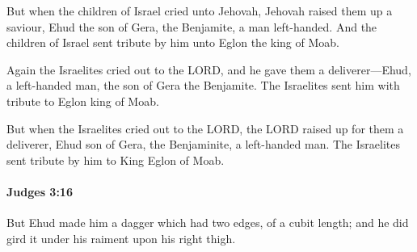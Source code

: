			\begin{versebox}
					\item[BHS] 
					\item[ASV] But when the children of Israel cried unto Jehovah, Jehovah raised them up a saviour, Ehud the son of Gera, the Benjamite, a man left-handed. And the children of Israel sent tribute by him unto Eglon the king of Moab.
					\item[NIV] Again the Israelites cried out to the LORD, and he gave them a deliverer—Ehud, a left-handed man, the son of Gera the Benjamite. The Israelites sent him with tribute to Eglon king of Moab.
					\item[NRSV] But when the Israelites cried out to the LORD, the LORD raised up for them a deliverer, Ehud son of Gera, the Benjaminite, a left-handed man. The Israelites sent tribute by him to King Eglon of Moab.
			\end{versebox}

		\paragraph{Judges 3:16} %
			\label{JUDGES-3-16}

			But Ehud made him a dagger which had two edges, of a cubit length; and he did gird it under his raiment upon his right thigh.

